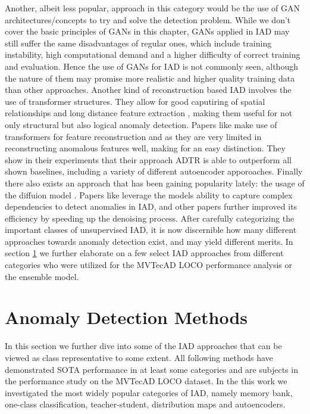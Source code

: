 Another, albeit less popular, approach in this category would be the use of GAN architectures/concepts to try and solve the detection problem. While we don't cover the basic principles of GANs in 
this chapter, GANs applied in IAD may still suffer the same disadvantages of regular ones, which include training instability, high computational demand and a higher difficulty of correct training and 
evaluation. Hence the use of GANs for IAD is not commonly seen, although the nature of them may promise more realistic and higher quality training data than other approaches.
Another kind of reconstruction based IAD involves the use of transformer structures. They allow for good caputiring of spatial relationships and long distance feature extraction \cite{xie2020benchmarking},
making them useful for not only structural but also logical anomaly detection. Papers like \cite{You_2023transformer} make use of transformers for feature reconstruction and as they are very 
limited in reconstructing anomalous features well, making for an easy distinction. They show in their experiments that their approach ADTR is able to outperform all shown baselines, including 
a variety of different autoencoder apporoaches.
Finally there also exists an approach that has been gaining popularity lately: the usage of the diffuion model \cite{ho2020denoisingdiffusionOG}. Papers like \cite{Wyatt_2022diffusionfirstapproach} 
leverage the models ability to capture complex dependencies to detect anomalies in IAD, and other papers \cite{zhang2023diffusionaddiffusionmodern} further improved its efficiency by speeding up 
the denoising process.
\newline
After carefully categorizing the important classes of unsupervised IAD, it is now discernible how many different approaches towards anomaly detection exist, and may yield different merits. 
In section \ref{sec:IADmethods} we further elaborate on a few select IAD approaches from different categories who were utilized for the MVTecAD LOCO performance analysis or the ensemble 
model. 


\section{Anomaly Detection Methods}
\label{sec:IADmethods}
In this section we further dive into some of the IAD approaches that can be viewed as class representative to some extent. All following methods have demonstrated SOTA performance in 
at least some categories and are subjects in the performance study on the MVTecAD LOCO dataset. In the this work we investigated the most widely popular categories of 
IAD, namely memory bank, one-class classification, teacher-student, distribution maps and autoencoders.%

